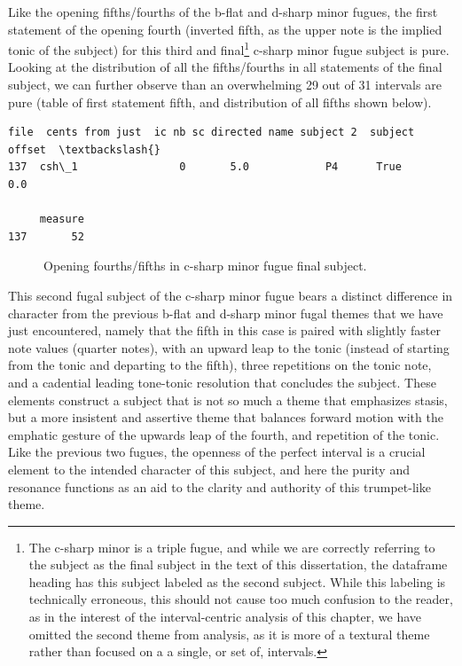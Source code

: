 Like the opening fifths/fourths of the b-flat and d-sharp minor fugues,
the first statement of the opening fourth (inverted fifth, as the upper
note is the implied tonic of the subject) for this third and
final\footnote{The c-sharp minor is a triple fugue, and while we are correctly referring to the subject as the final subject in the text of this dissertation, the dataframe heading has this subject labeled as the second subject. While this labeling is technically erroneous, this should not cause too much confusion to the reader, as in the interest of the interval-centric analysis of this chapter, we have omitted the second theme from analysis, as it is more of a textural theme rather than focused on a a single, or set of, intervals.}
c-sharp minor fugue subject is pure. Looking at the distribution of all
the fifths/fourths in all statements of the final subject, we can
further observe than an overwhelming 29 out of 31 intervals are pure
(table of first statement fifth, and distribution of all fifths shown
below).

\begin{Verbatim}[commandchars=\\\{\}]
      file  cents from just  ic nb sc directed name subject 2  subject offset  \textbackslash{}
137  csh\_1                0       5.0            P4      True             0.0   

     measure  
137       52  
\end{Verbatim}




\begin{figure}[H]
    \begin{center}
    \caption{Opening fourths/fifths in c-sharp minor fugue final subject. }
    \end{center}
\end{figure}
    
    This second fugal subject of the c-sharp minor fugue bears a distinct
difference in character from the previous b-flat and d-sharp minor fugal
themes that we have just encountered, namely that the fifth in this case
is paired with slightly faster note values (quarter notes), with an
upward leap to the tonic (instead of starting from the tonic and
departing to the fifth), three repetitions on the tonic note, and a
cadential leading tone-tonic resolution that concludes the subject.
These elements construct a subject that is not so much a theme that
emphasizes stasis, but a more insistent and assertive theme that
balances forward motion with the emphatic gesture of the upwards leap of
the fourth, and repetition of the tonic. Like the previous two fugues,
the openness of the perfect interval is a crucial element to the
intended character of this subject, and here the purity and resonance
functions as an aid to the clarity and authority of this trumpet-like
theme.

